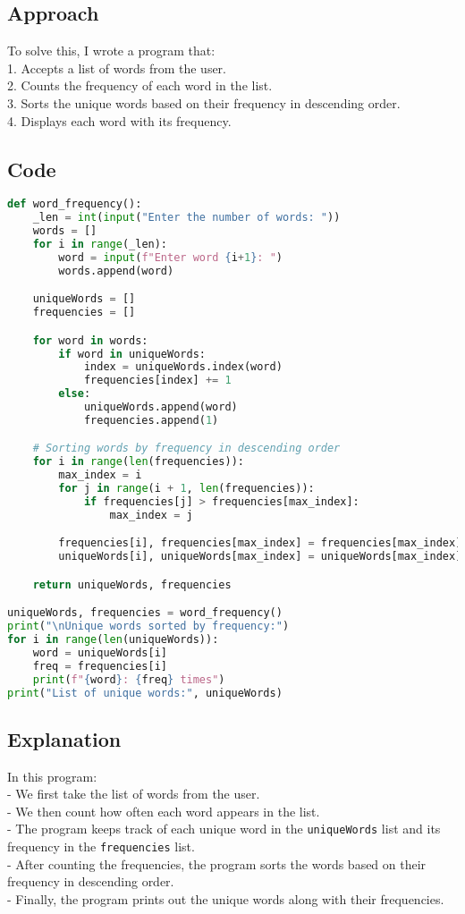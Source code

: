 \documentclass{article}
\begin{document}
\subsection{Approach}
To solve this, I wrote a program that:\\
1. Accepts a list of words from the user.\\
2. Counts the frequency of each word in the list.\\
3. Sorts the unique words based on their frequency in descending order.\\
4. Displays each word with its frequency.

\subsection{Code}

\begin{lstlisting}[language=Python]
def word_frequency():
    _len = int(input("Enter the number of words: ")) 
    words = [] 
    for i in range(_len):
        word = input(f"Enter word {i+1}: ")
        words.append(word)

    uniqueWords = []  
    frequencies = [] 

    for word in words:
        if word in uniqueWords:  
            index = uniqueWords.index(word)
            frequencies[index] += 1
        else:  
            uniqueWords.append(word)
            frequencies.append(1)

    # Sorting words by frequency in descending order
    for i in range(len(frequencies)):
        max_index = i
        for j in range(i + 1, len(frequencies)):
            if frequencies[j] > frequencies[max_index]: 
                max_index = j

        frequencies[i], frequencies[max_index] = frequencies[max_index], frequencies[i]
        uniqueWords[i], uniqueWords[max_index] = uniqueWords[max_index], uniqueWords[i]

    return uniqueWords, frequencies

uniqueWords, frequencies = word_frequency()
print("\nUnique words sorted by frequency:")
for i in range(len(uniqueWords)):
    word = uniqueWords[i]
    freq = frequencies[i]
    print(f"{word}: {freq} times")
print("List of unique words:", uniqueWords)
\end{lstlisting}

\subsection{Explanation}
In this program:\\
- We first take the list of words from the user.\\
- We then count how often each word appears in the list.\\
- The program keeps track of each unique word in the \texttt{uniqueWords} list and its frequency in the \texttt{frequencies} list.\\
- After counting the frequencies, the program sorts the words based on their frequency in descending order.\\
- Finally, the program prints out the unique words along with their frequencies.
\end{document}
